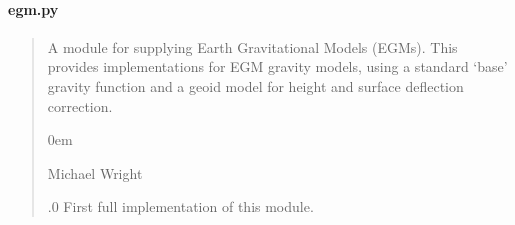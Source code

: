 \documentclass[letterpaper,10pt,english]{sphinxmanual}
\begin{document}
\paragraph{egm.py}
\label{\detokenize{modules/gravity/egm:egm-py}}\begin{quote}\begin{description}
\sphinxAtStartPar
A module for supplying Earth Gravitational Models (EGMs).
This provides implementations for EGM gravity models, using a standard
‘base’ gravity function and a geoid model for height and surface
deflection correction.

\begin{DUlineblock}{0em}
\item[] Michael Wright \sphinxhyphen{} 
\end{DUlineblock}

.0 \sphinxhyphen{} First full implementation of this module.

\end{description}\end{quote}
\end{document}
